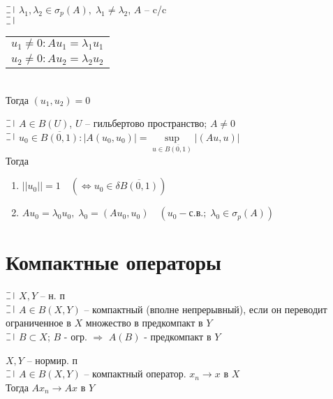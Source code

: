 \begin{utv}[3]
  $\letus$ $\lambda_1, \lambda_2 \in \sigma_p(A), \; \lambda_1 \neq \lambda_2$, $A$ -- c/c\\
  $\letus$
  \begin{tabular}[t]{c}
  $u_1 \neq 0: Au_1 = \lambda_1 u_1$\\
  $u_2 \neq 0: Au_2 = \lambda_2 u_2$
  \end{tabular}
  \\
  Тогда $(u_1, u_2) = 0$
\end{utv}

\begin{theorem}
  $\letus$ $A \in B(U)$, $U$ -- гильбертово пространство; $A \neq 0$\\
  $\letus$ $u_0 \in \overline{B(0, 1)}: |A(u_0, u_0)| = \sup\limits_{u\in \overline{B(0, 1)}}|(Au, u)|$\\
  Тогда\begin{minipage}[t]{0.8\linewidth}\begin{enumerate}[itemsep=1mm]
      \item $||u_0|| = 1 \quad (\Leftrightarrow u_0 \in \delta \overline{B(0, 1)})$
      \item $Au_0 = \lambda_0u_0, \; \lambda_0 = (Au_0, u_0) \quad (u_0 - \text{с.в.}; \; \lambda_0 \in \sigma_p(A))$
    \end{enumerate}\end{minipage}
\end{theorem}

\section*{Компактные операторы}

\begin{definition}
  $\letus$ $X, Y$ -- н. п\\ $\letus$ $A \in B(X, Y)$ -- компактный (вполне непрерывный), если он переводит ограниченное в $X$ множество
  в предкомпакт в $Y$\\
  $\letus$ $B \subset X$; $B$ - огр. $\Rightarrow$ $A(B)$ - предкомпакт в $Y$
\end{definition}

\begin{theorem}[Th1]
  $X, Y$ -- нормир. п\\
  $\letus$ $A \in B(X, Y)$ -- компактный оператор. $x_n \longrightarrow x$ в $X$\\
  Тогда $Ax_n \longrightarrow Ax$ в $Y$
\end{theorem}

